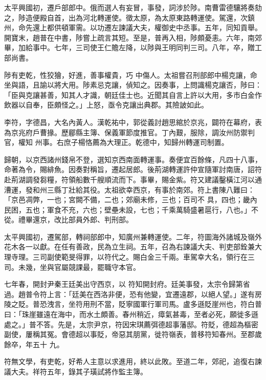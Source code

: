 \begin{pinyinscope}
 太平興國初，遷戶部郎中。俄而選人有妄冒，事發，詞涉於陟。南曹雷德驤將奏劾之，陟造便殿自首，出為河北轉運使。徵太原，為太原東路轉運使。駕還，次鎮州，命先還上都供頓軍需。以功遷左諫議大夫，權御史中丞事。五年，同知貢舉。開寶末，趙普在中書，陟嘗上疏言其短。至是，普再入相，陟頗憂恚。六年，南郊畢，加給事中。七年，三司使王仁贍左降，以陟與王明同判三司。八年，卒，贈工部尚書。



 陟有吏乾，性狡獪，好進，善事權貴，巧
 中傷人。太祖嘗召刑部郎中楊克讓，命坐與語，且諭以將大用。陟素忌克讓，偵知之。因奏事，上問識楊克讓否，陟曰：「臣與克讓甚善，知其人才識，朝廷佳士也。近聞其自言上許以大用，多市白金作飲器以自奉，臣頗怪之。」上怒，亟令克讓出典郡。其險詖如此。



 李符，字德昌，大名內黃人。漢乾祐中，郭從義討趙思綰於京兆，闢符在幕府，表為京兆府戶曹掾。歷郿縣主簿、保義軍節度推官。丁內艱，服除，調汝州防禦判官，權知
 州事。右庶子楊恪薦為大理正。乾德中，知歸州轉運司制置。



 歸朝，以京西諸州錢帛不登，選知京西南面轉運事。奏便宜百餘條，凡四十八事，命著為令，賜緋魚。因奏對稱旨，遷起居郎。後荊湖轉運許仲宣隨軍討南唐，詔符赴荊湖調發芻糧，符領船數千艘順流而下。事畢，賜金紫。符又建議鑿橫江河以通漕運，發和州三縣丁壯給其役。太祖欲幸西京，有事於南郊。符上書陳八難曰：「京邑凋弊，一也；宮闕不備，二也；郊廟未修，三也；百司不
 具，四也；畿內民困，五也；軍食不充，六也；壁壘未設，七也；千乘萬騎盛暑扈行，八也。」不從。禮畢還京，改比部員外郎、判刑部。



 太平興國初，遷駕部，轉祠部郎中，知廣州兼轉運使。二年，符圖海外諸城及嶺外花木各一以獻。在任有善政，民為立生祠。五年，召為右諫議大夫、判吏部銓兼大理寺理。三司副使範旻得罪，以符代之。賜白金三千兩。車駕幸大名，領行在三司。未幾，坐與官屬競課最，罷職守本官。



 七年春，開封尹秦王廷美出守西京，以
 符知開封府。廷美事發，太宗令歸第省過。趙普令符上言：「廷美在西洛非便，恐有他變，宜遷遠郡，以絕人望。」遂有房陵之貶。普恐洩言，坐符用刑不當，貶寧國軍行軍司馬。盧多遜貶崖州也，符白普曰：「珠崖雖遠在海中，而水土頗善。春州稍近，瘴氣甚毒，至者必死，願徙多遜處之。」普不答。先是，太宗尹京，符因宋琪薦弭德超事藩邸。符貶，德超為樞密副使，屢稱其冤。會德超以事貶，帝惡其朋黨，徙符嶺表，普移符知春州。至郡歲餘卒，年五十
 九。



 符無文學，有吏乾，好希人主意以求進用，終以此敗。至道二年，郊祀，追復右諫議大夫。祥符五年，錄其子璜試將作監主簿。




\end{pinyinscope}
